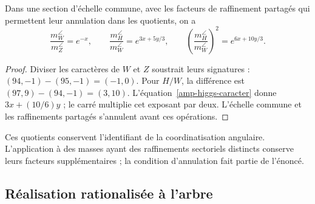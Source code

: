 \begin{proposition}
Dans une section d’échelle commune, avec les facteurs de raffinement partagés
qui permettent leur annulation dans les quotients, on a
\begin{equation}
 \frac{m_W^{\angle}}{m_Z^{\angle}}=e^{-x},\qquad
 \frac{m_H^{\angle}}{m_W^{\angle}}
 =e^{3x+5y/3},\qquad
 \left(\frac{m_H^{\angle}}{m_W^{\angle}}\right)^2
 =e^{6x+10y/3}.
 \label{amp-higgs-cocientes}
\end{equation}
\end{proposition}
\begin{proof}
Diviser les caractères de $W$ et $Z$ soustrait leurs signatures : $(94,-1)-(95,-1)=(-1,0)$.
Pour $H/W$, la différence est $(97,9)-(94,-1)=(3,10)$.
L’équation~\eqref{amp-higgs-caracter} donne $3x+(10/6)y$ ; le carré
multiplie cet exposant par deux. L’échelle commune et les raffinements
partagés s’annulent avant ces opérations.
\end{proof}
Ces quotients conservent l’identifiant de la coordinatisation angulaire. L’application
à des masses ayant des raffinements sectoriels distincts conserve leurs facteurs
supplémentaires ; la condition d’annulation fait partie de l’énoncé.

\subsection{Réalisation rationalisée à l’arbre}

